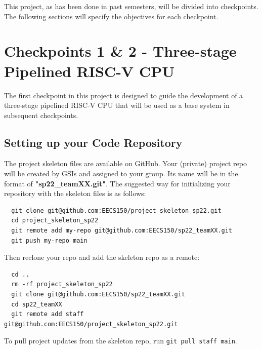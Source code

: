 \documentclass[11pt]{article}
\begin{document}
This project, as has been done in past semesters, will be divided into checkpoints. The following sections will specify the objectives for each checkpoint.

\newpage
\section{Checkpoints 1 \& 2 - Three-stage Pipelined RISC-V CPU}
The first checkpoint in this project is designed to guide the development of a three-stage pipelined RISC-V CPU that will be used as a base system in subsequent checkpoints.



\subsection{Setting up your Code Repository}
The project skeleton files are available on GitHub. Your (private) project repo will be created by GSIs and assigned to your group. Its name will be in the format of \textbf{"sp22\_teamXX.git"}.
The suggested way for initializing your repository with the skeleton files is as follows:

\begin{verbatim}
  git clone git@github.com:EECS150/project_skeleton_sp22.git
  cd project_skeleton_sp22
  git remote add my-repo git@github.com:EECS150/sp22_teamXX.git
  git push my-repo main
\end{verbatim}


Then reclone your repo and add the skeleton repo as a remote:
\begin{verbatim}
  cd ..
  rm -rf project_skeleton_sp22
  git clone git@github.com:EECS150/sp22_teamXX.git
  cd sp22_teamXX
  git remote add staff git@github.com:EECS150/project_skeleton_sp22.git
\end{verbatim}

To pull project updates from the skeleton repo, run \verb|git pull staff main|.
\end{document}
